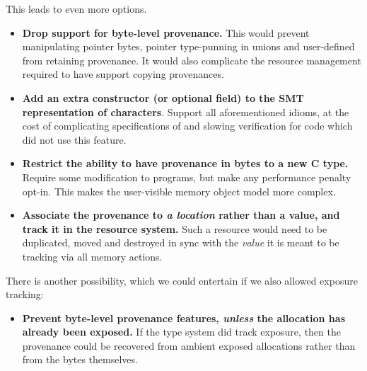 This leads to even more options.
\begin{itemize}
    \item \textbf{Drop support for byte-level provenance.} This would prevent
        manipulating pointer bytes, pointer type-punning in unions and
        user-defined  from retaining provenance. It would
        also complicate the resource management required to have
         support copying provenances.
    \item \textbf{Add an extra constructor (or optional field) to the SMT
        representation of characters}. Support all aforementioned idioms, at
        the cost of complicating specifications of and slowing verification for
        code which did not use this feature.
    \item \textbf{Restrict the ability to have provenance in bytes to a new C
        type.} Require some modification to  programs, but make any
        performance penalty opt-in. This makes the user-visible memory object
        model more complex.
    \item \textbf{Associate the provenance to \emph{a location} rather than a
        value, and track it in the resource system.} Such a resource would need
        to be duplicated, moved and destroyed in sync with the \emph{value} it
        is meant to be tracking via all memory actions.
\end{itemize}

There is another possibility, which we could entertain if we also allowed
exposure tracking:
\begin{itemize}
    \item \textbf{Prevent byte-level provenance features, \emph{unless} the
        allocation has already been exposed.} If the type system did
        track exposure, then the provenance could be recovered from ambient
        exposed allocations rather than from the bytes themselves.
\end{itemize}

